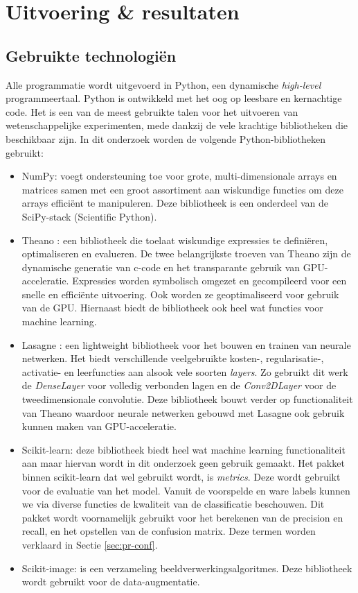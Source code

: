 \chapter{Uitvoering \& resultaten}
\section{Gebruikte technologi\"en}
Alle programmatie wordt uitgevoerd in Python, een dynamische \textit{high-level} programmeertaal. Python is ontwikkeld met het oog op leesbare en kernachtige code. Het is een van de meest gebruikte talen voor het uitvoeren van wetenschappelijke experimenten, mede dankzij de vele krachtige bibliotheken die beschikbaar zijn. In dit onderzoek worden de volgende Python-bibliotheken gebruikt:

\begin{itemize}
	\item NumPy: voegt ondersteuning toe voor grote, multi-dimensionale arrays en matrices samen met een groot assortiment aan wiskundige functies om deze arrays effici\"ent te  manipuleren. Deze bibliotheek is een onderdeel van de SciPy-stack (Scientific Python).
	\item Theano \cite{theano}:  een bibliotheek die toelaat wiskundige expressies te defini\"eren, optimaliseren en evalueren. De twee belangrijkste troeven van Theano zijn de dynamische generatie van c-code en het transparante gebruik van GPU-acceleratie. Expressies worden symbolisch omgezet en gecompileerd voor een snelle en effici\"ente uitvoering. Ook worden ze geoptimaliseerd  voor gebruik van de GPU.  Hiernaast biedt de bibliotheek ook heel wat functies voor machine learning. 
	\item Lasagne \cite{lasagne}: een lightweight bibliotheek voor het bouwen en trainen van neurale netwerken. Het biedt verschillende veelgebruikte kosten-, regularisatie-, activatie- en leerfuncties aan alsook vele soorten \textit{layers}. Zo gebruikt dit werk de \textit{DenseLayer} voor volledig verbonden lagen en de \textit{Conv2DLayer} voor de tweedimensionale convolutie. Deze bibliotheek bouwt verder op functionaliteit van Theano waardoor neurale netwerken gebouwd met Lasagne ook gebruik kunnen maken van GPU-acceleratie.
	\item Scikit-learn: deze bibliotheek biedt heel wat machine learning functionaliteit aan maar hiervan wordt in dit onderzoek geen gebruik gemaakt. Het pakket binnen scikit-learn dat wel gebruikt wordt, is \textit{metrics}. Deze wordt gebruikt voor de evaluatie van het model. Vanuit de voorspelde en ware labels kunnen we via diverse functies de kwaliteit van de classificatie beschouwen. Dit pakket wordt voornamelijk gebruikt voor het berekenen van de precision en recall, en het opstellen van de confusion matrix. Deze termen worden verklaard in Sectie \ref{sec:pr-conf}.
	\item Scikit-image: is een verzameling beeldverwerkingsalgoritmes. Deze bibliotheek wordt gebruikt voor de data-augmentatie.
	
\end{itemize}
